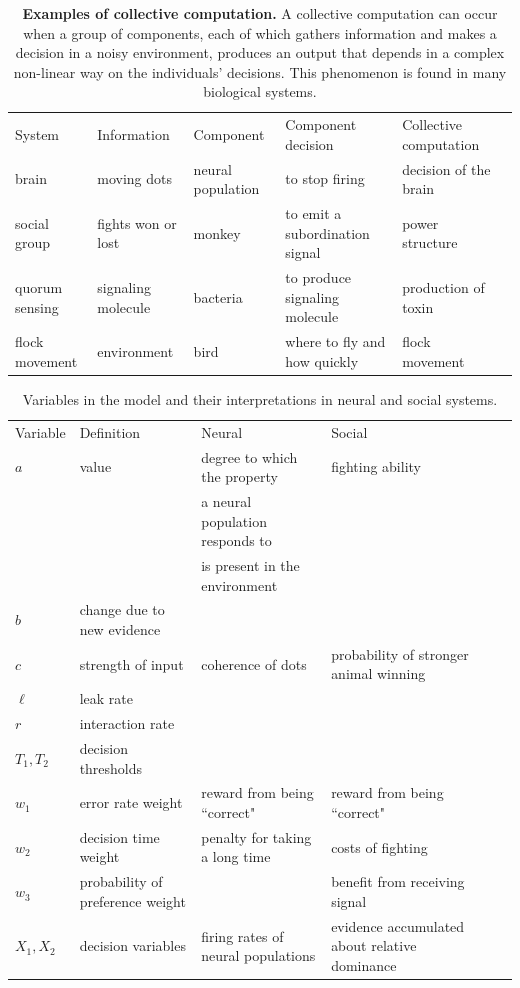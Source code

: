 \documentclass{pnastwo}
\begin{document}
\begin{table}[h]
\caption{\label{examples}{\bf  Examples of collective computation.} A collective computation can occur when a group of components, each of which gathers information and makes a decision in a noisy environment, produces an output that depends in a complex non-linear way on the individuals' decisions. This phenomenon is found in many biological systems. }
\begin{tabular}{@{\vrule height 10.5pt depth4pt  width0pt}llllll@{}}
System & Information & Component &   Component decision & Collective computation \\
\cline{1-5} 
brain & moving dots& neural population & to stop firing & decision of the brain
\\  social group & fights won or lost & monkey & to emit a subordination signal & power structure
\\  quorum sensing & signaling molecule & bacteria & to produce signaling molecule & production of toxin
\\ flock movement & environment & bird & where to fly and how quickly & flock movement
\\
\hline
\end{tabular}
\end{table}


\begin{table}[ht]
\caption{\label{variables}{ Variables in the model and their interpretations in neural and social systems.} }
\begin{tabular}{@{\vrule height 10.5pt depth4pt  width0pt}llllll@{}}
Variable & Definition & Neural &   Social \\
\cline{1-4} 
$a$  & value &  degree to which the property  & fighting ability
\\ & & a neural population responds to 
\\ & & is present in the environment&
\\ $b$ & change due to new evidence
\\$c$ & strength of input & coherence of dots & probability of stronger animal winning
\\ $\ell$ & leak rate
\\ $r$ & interaction rate 
\\ $T_1,T_2$ & decision thresholds
\\ $w_1$ & error rate weight & reward from being ``correct" & reward from being ``correct"
\\ $w_2$ & decision time weight & penalty for taking a long time & costs of fighting
\\ $w_3$ & probability of preference weight &  & benefit from receiving signal
\\$X_1,X_2$ & decision variables &  firing rates of neural populations & evidence accumulated about relative dominance
\\
\hline
\end{tabular}
\end{table}
\end{document}
